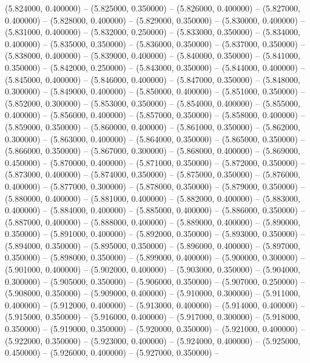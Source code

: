 (5.824000, 0.400000) -- 
(5.825000, 0.350000) -- 
(5.826000, 0.400000) -- 
(5.827000, 0.400000) -- 
(5.828000, 0.400000) -- 
(5.829000, 0.350000) -- 
(5.830000, 0.400000) -- 
(5.831000, 0.400000) -- 
(5.832000, 0.250000) -- 
(5.833000, 0.350000) -- 
(5.834000, 0.400000) -- 
(5.835000, 0.350000) -- 
(5.836000, 0.350000) -- 
(5.837000, 0.350000) -- 
(5.838000, 0.400000) -- 
(5.839000, 0.400000) -- 
(5.840000, 0.350000) -- 
(5.841000, 0.350000) -- 
(5.842000, 0.250000) -- 
(5.843000, 0.350000) -- 
(5.844000, 0.400000) -- 
(5.845000, 0.400000) -- 
(5.846000, 0.400000) -- 
(5.847000, 0.350000) -- 
(5.848000, 0.300000) -- 
(5.849000, 0.400000) -- 
(5.850000, 0.400000) -- 
(5.851000, 0.350000) -- 
(5.852000, 0.300000) -- 
(5.853000, 0.350000) -- 
(5.854000, 0.400000) -- 
(5.855000, 0.400000) -- 
(5.856000, 0.400000) -- 
(5.857000, 0.350000) -- 
(5.858000, 0.400000) -- 
(5.859000, 0.350000) -- 
(5.860000, 0.400000) -- 
(5.861000, 0.350000) -- 
(5.862000, 0.300000) -- 
(5.863000, 0.400000) -- 
(5.864000, 0.350000) -- 
(5.865000, 0.350000) -- 
(5.866000, 0.350000) -- 
(5.867000, 0.300000) -- 
(5.868000, 0.400000) -- 
(5.869000, 0.450000) -- 
(5.870000, 0.400000) -- 
(5.871000, 0.350000) -- 
(5.872000, 0.350000) -- 
(5.873000, 0.400000) -- 
(5.874000, 0.350000) -- 
(5.875000, 0.350000) -- 
(5.876000, 0.400000) -- 
(5.877000, 0.300000) -- 
(5.878000, 0.350000) -- 
(5.879000, 0.350000) -- 
(5.880000, 0.400000) -- 
(5.881000, 0.400000) -- 
(5.882000, 0.400000) -- 
(5.883000, 0.400000) -- 
(5.884000, 0.400000) -- 
(5.885000, 0.400000) -- 
(5.886000, 0.350000) -- 
(5.887000, 0.400000) -- 
(5.888000, 0.400000) -- 
(5.889000, 0.400000) -- 
(5.890000, 0.350000) -- 
(5.891000, 0.400000) -- 
(5.892000, 0.350000) -- 
(5.893000, 0.350000) -- 
(5.894000, 0.350000) -- 
(5.895000, 0.350000) -- 
(5.896000, 0.400000) -- 
(5.897000, 0.350000) -- 
(5.898000, 0.350000) -- 
(5.899000, 0.400000) -- 
(5.900000, 0.300000) -- 
(5.901000, 0.400000) -- 
(5.902000, 0.400000) -- 
(5.903000, 0.350000) -- 
(5.904000, 0.300000) -- 
(5.905000, 0.350000) -- 
(5.906000, 0.350000) -- 
(5.907000, 0.250000) -- 
(5.908000, 0.350000) -- 
(5.909000, 0.400000) -- 
(5.910000, 0.300000) -- 
(5.911000, 0.400000) -- 
(5.912000, 0.400000) -- 
(5.913000, 0.400000) -- 
(5.914000, 0.400000) -- 
(5.915000, 0.350000) -- 
(5.916000, 0.400000) -- 
(5.917000, 0.300000) -- 
(5.918000, 0.350000) -- 
(5.919000, 0.350000) -- 
(5.920000, 0.350000) -- 
(5.921000, 0.400000) -- 
(5.922000, 0.350000) -- 
(5.923000, 0.400000) -- 
(5.924000, 0.400000) -- 
(5.925000, 0.450000) -- 
(5.926000, 0.400000) -- 
(5.927000, 0.350000) -- 
